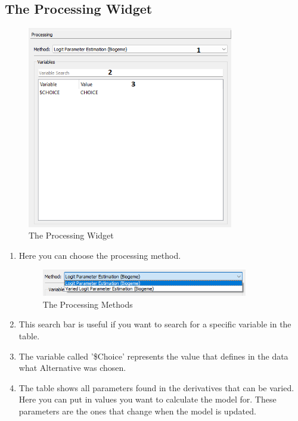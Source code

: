 \documentclass{article}
\begin{document}
\subsection{The Processing Widget} \label{sec:processing}
\begin{figure}[H]%
  \centering
  \includegraphics[width=9cm]{docs/User Manual/img/Processing.png}
  \caption{The Processing Widget}
  \label{fig:processing} 
\end{figure}
\begin{enumerate} [label=\textbf{\arabic*})]
    \item Here you can choose the processing method. \\
    \begin{figure}[H]%
        \centering
        \includegraphics[width=9cm]{docs/User Manual/img/Processing method.png}
        \caption{The Processing Methods}
        \label{fig:processingmethods} 
    \end{figure}
    \item This search bar is useful if you want to search for a specific variable in the table.
    \item The variable called '\$Choice' represents the value that defines in the data what Alternative was chosen.
    \item The table shows all parameters found in the derivatives that can be varied. Here you can put in values you want to calculate the model for. These parameters are the ones that change when the model is updated.
\end{enumerate}
\newpage
\end{document}
